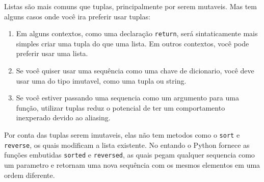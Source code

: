 Listas são mais comuns que tuplas, principalmente por serem mutaveis.
Mas tem alguns casos onde você ira preferir usar tuplas:

\begin{enumerate}

\item Em alguns contextos, como uma declaração {\tt return}, será
sintaticamente mais simples criar uma tupla do que uma lista. Em 
outros contextos, você pode preferir usar uma lista.

\item Se você quiser usar uma sequência como uma chave de dicionario,
você deve usar uma do tipo imutavel, como uma tupla ou string.

\item Se você estiver passando uma sequencia como um argumento para
uma função, utilizar tuplas reduz o potencial de ter um comportamento
inexperado devido ao aliasing.

\end{enumerate}

Por conta das tuplas serem imutaveis, elas não tem metodos como o
{\tt sort} e {\tt reverse}, os quais modificam a lista existente.
No entando o Python fornece as funções embutidas {\tt sorted}
e {\tt reversed}, as quais pegam qualquer sequencia como um parametro
e retornam uma nova sequência com os mesmos elementos em uma ordem
diferente.



